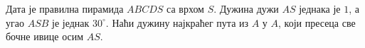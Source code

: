 Дата је правилна пирамида $ABCDS$ са врхом $S$.
Дужина дужи $AS$ једнака је $1$, а угао $ASB$ је једнак $30^\circ$. 
Наћи дужину најкраћег пута из $A$ у $A$, који пресеца све бочне ивице осим
$AS$.

\solution

